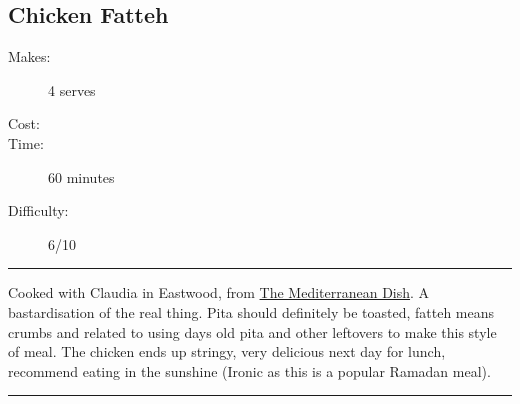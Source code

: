 \documentclass[]{article}
\begin{document}
\subsection*{\center\huge Chicken Fatteh}
\begin{description}
\item[Makes:] 4 serves
\item[Cost:] \textdollar
\item[Time:] 60 minutes
\item[Difficulty:] 6/10
\end{description}
\vspace{0.2cm}\hrule\vspace{0.5cm}
\begin{adjustwidth}{0.5 cm}{0.5 cm}

Cooked with Claudia in Eastwood, from \href{https://www.themediterraneandish.com/lebanese-chicken-fatteh-dinner-bowls/}{The Mediterranean Dish}. A bastardisation of the real thing. Pita should definitely be toasted, fatteh means crumbs and related to using days old pita and other leftovers to make this style of meal. The chicken ends up stringy, very delicious next day for lunch, recommend eating in the sunshine (Ironic as this is a popular Ramadan meal). \hfill{}\color{black}

\end{adjustwidth}
\vspace{0.5cm}\hrule
\end{document}
